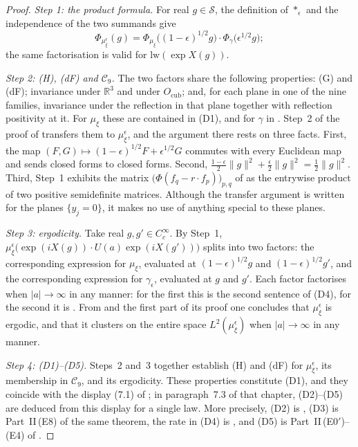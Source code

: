 \documentclass[11pt]{amsart}
\theoremstyle{definition}
\begin{document}
\begin{proof}
\emph{Step 1: the product formula.}
For real $g\in\mathcal S$, the definition of $\ast_\epsilon$ \cite[Section~21.11.1]{QEDI} and the independence of the two summands give
\begin{equation*}
\Phi_{\mu_\xi^\epsilon}(g)=\Phi_{\mu_\xi}\bigl((1-\epsilon)^{1/2}g\bigr)\cdot\Phi_\gamma\bigl(\epsilon^{1/2}g\bigr);
\end{equation*}
the same factorisation is valid for $\mathrm{lw}(\exp X(g))$.

\emph{Step 2: (H), (dF) and $\mathcal C_9$.}
The two factors share the following properties: (G) and (dF); invariance under $\mathbb R^3$ and under $O_{\mathrm{cub}}$; and, for each plane in one of the nine families, invariance under the reflection in that plane together with reflection positivity at it.
For $\mu_\xi$ these are contained in (D1), and for $\gamma$ in \cite[Lemma~12.29]{QEDII}.
Step~2 of the proof of \cite[Proposition~21.40\,(a)]{QEDI} transfers them to $\mu_\xi^\epsilon$, and the argument there rests on three facts.
First, the map $(F,G)\mapsto(1-\epsilon)^{1/2}F+\epsilon^{1/2}G$ commutes with every Euclidean map and sends closed forms to closed forms.
Second, $\frac{1-\epsilon}2\|g\|^2+\frac\epsilon2\|g\|^2=\frac12\|g\|^2$.
Third, Step~1 exhibits the matrix $\bigl(\Phi(f_q-r\cdot f_p)\bigr)_{p,q}$ of \cite[(n3)]{QEDIII} as the entrywise product of two positive semidefinite matrices.
Although the transfer argument is written for the planes $\{y_j=0\}$, it makes no use of anything special to these planes.

\emph{Step 3: ergodicity.}
Take real $g,g'\in C_c^\infty$.
By Step~1, $\mu_\xi^\epsilon\bigl(\exp(iX(g))\cdot U(a)\exp(iX(g'))\bigr)$ splits into two factors: the corresponding expression for $\mu_\xi$, evaluated at $(1-\epsilon)^{1/2}g$ and $(1-\epsilon)^{1/2}g'$, and the corresponding expression for $\gamma_\epsilon$, evaluated at $g$ and $g'$.
Each factor factorises when $|a|\to\infty$ in any manner: for the first this is the second sentence of (D4), for the second it is \cite[Lemma~12.29]{QEDII}.
From \cite[Lemma~8.14\,(a)]{QEDI} and the first part of its proof one concludes that $\mu_\xi^\epsilon$ is ergodic, and that it clusters on the entire space $L^2(\mu_\xi^\epsilon)$ when $|a|\to\infty$ in any manner.

\emph{Step 4: (D1)--(D5).}
Steps~2 and~3 together establish (H) and (dF) for $\mu_\xi^\epsilon$, its membership in $\mathcal C_9$, and its ergodicity.
These properties constitute (D1), and they coincide with the display (7.1) of \cite[Chapter~44]{QEDIII}; in paragraph~7.3 of that chapter, (D2)--(D5) are deduced from this display for a single law.
More precisely, (D2) is \cite[Theorem~1.4, Part~I\,(a)--(d), (f)]{QEDII}, (D3) is Part~II\,(E8) of the same theorem, the rate in (D4) is \cite[Theorem~12.39]{QEDII}, and (D5) is Part~II\,(E0$'$)--(E4) of \cite[Theorem~1.4]{QEDII}.


\end{proof}
\end{document}

